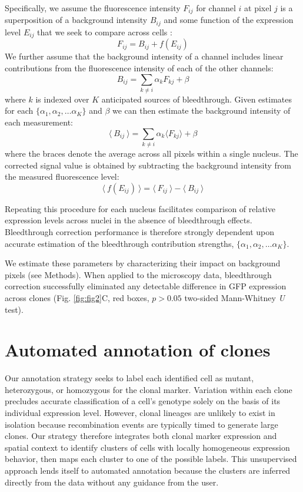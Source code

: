 Specifically, we assume the fluorescence intensity $F_{ij}$ for channel $i$ at pixel $j$ is a superposition of a background intensity $B_{ij}$ and some function of the expression level $E_{ij}$ that we seek to compare across cells \cite{McMullen2010}:
\begin{equation}
F_{ij} = B_{ij} + f(E_{ij})
\end{equation}
We further assume that the background intensity of a channel includes linear contributions from the fluorescence intensity of each of the other channels:
\begin{equation}
B_{ij} = \sum_{k \neq i}{\alpha_k F_{kj}} + \beta
\end{equation}
where $k$ is indexed over $K$ anticipated sources of bleedthrough. Given estimates for each $\{\alpha_1, \alpha_2, \ldots \alpha_K\}$ and $\beta$ we can then estimate the background intensity of each measurement:
\begin{equation} \label{eq:bg_model}
\langle\ B_{ij}\ \rangle = \sum_{k \neq i}{\alpha_k \langle F_{kj} \rangle} + \beta
\end{equation}
where the braces denote the average across all pixels within a single nucleus. The corrected signal value is obtained by subtracting the background intensity from the measured fluorescence level:
\begin{equation} \label{eq:correction}
\langle\ f(E_{ij}) \ \rangle = \langle\ F_{ij}\ \rangle - \langle\ B_{ij}\ \rangle
\end{equation}

Repeating this procedure for each nucleus facilitates comparison of relative expression levels across nuclei in the absence of bleedthrough effects. Bleedthrough correction performance is therefore strongly dependent upon accurate estimation of the bleedthrough contribution strengths, $\{\alpha_1, \alpha_2, \ldots \alpha_K\}$. 

We estimate these parameters by characterizing their impact on background pixels (see Methods). When applied to the microscopy data, bleedthrough correction successfully eliminated any detectable difference in GFP expression across clones (Fig. \ref{fig:fig2}C, red boxes, $p>0.05$ two-sided Mann-Whitney \textit{U} test).


\section{Automated annotation of clones}
\label{ch:annotation}

Our annotation strategy seeks to label each identified cell as mutant, heterozygous, or homozygous for the clonal marker. Variation within each clone precludes accurate classification of a cell's genotype solely on the basis of its individual expression level. However, clonal lineages are unlikely to exist in isolation because recombination events are typically timed to generate large clones. Our strategy therefore integrates both clonal marker expression and spatial context to identify clusters of cells with locally homogeneous expression behavior, then maps each cluster to one of the possible labels. This unsupervised approach lends itself to automated annotation because the clusters are inferred directly from the data without any guidance from the user.

